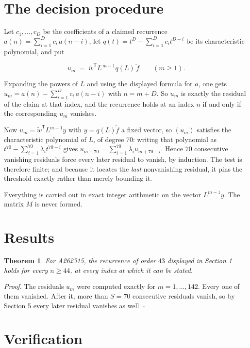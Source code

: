 \documentclass[11pt]{article}
\newtheorem{theorem}{Theorem}
\theoremstyle{definition}
\begin{document}
\section{The decision procedure}

Let $c_1,\dots,c_D$ be the coefficients of a claimed recurrence $a(n) = \sum_{i=1}^{D} c_i\,a(n-i)$, let $q(t) = t^{D} - \sum_{i=1}^{D} c_i t^{D-i}$ be its characteristic polynomial, and put

\[u_m \;=\; \tilde w^{\mathsf T} L^{\,m-1} q(L)\,\tilde f \qquad (m \ge 1).\]

Expanding the powers of $L$ and using the displayed formula for $a$, one gets $u_m = a(n) - \sum_{i=1}^{D} c_i\,a(n-i)$ with $n = m + D$. So $u_m$ is exactly the residual of the claim at that index, and the recurrence holds at an index $n$ if and only if the corresponding $u_m$ vanishes.

Now $u_m = \tilde w^{\mathsf T} L^{m-1} y$ with $y = q(L)\tilde f$ a fixed vector, so $(u_m)$ satisfies the characteristic polynomial of $L$, of degree $70$: writing that polynomial as $t^{70} - \sum_{i=1}^{70} \lambda_i t^{70-i}$ gives $u_{m+70} = \sum_{i=1}^{70} \lambda_i u_{m+70-i}$. Hence $70$ consecutive vanishing residuals force every later residual to vanish, by induction. The test is therefore finite; and because it locates the {\itshape last} nonvanishing residual, it pins the threshold exactly rather than merely bounding it.

Everything is carried out in exact integer arithmetic on the vector $L^{m-1}y$. The matrix $M$ is never formed.

\section{Results}

\begin{theorem} For A262315, the recurrence of order $43$ displayed in Section 1 holds for every $n \ge 44$, at every index at which it can be stated.\end{theorem}

{\itshape Proof.} The residuals $u_m$ were computed exactly for $m = 1,\dots,142$. Every one of them vanished. After it, more than $S = 70$ consecutive residuals vanish, so by Section 5 every later residual vanishes as well. $\square$

\section{Verification}
\end{document}
